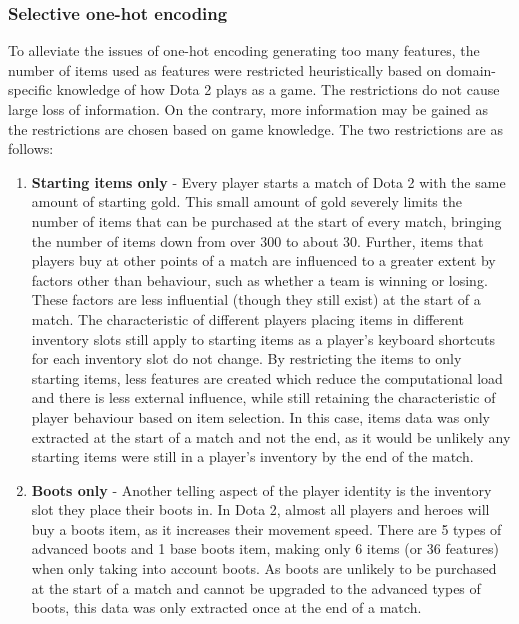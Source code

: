 \documentclass[Report.tex]{subfiles}
\begin{document}
\subsubsection{Selective one-hot encoding}
To alleviate the issues of one-hot encoding generating too many features, the number of items used as features were restricted heuristically based on domain-specific knowledge of how Dota 2 plays as a game. The restrictions do not cause large loss of information. On the contrary, more information may be gained as the restrictions are chosen based on game knowledge. The two restrictions are as follows:
\begin{enumerate}
\item \textbf{Starting items only} - Every player starts a match of Dota 2 with the same amount of starting gold. This small amount of gold severely limits the number of items that can be purchased at the start of every match, bringing the number of items down from over 300 to about 30. Further, items that players buy at other points of a match are influenced to a greater extent by factors other than behaviour, such as whether a team is winning or losing. These factors are less influential (though they still exist) at the start of a match. The characteristic of different players placing items in different inventory slots still apply to starting items as a player's keyboard shortcuts for each inventory slot do not change. By restricting the items to only starting items, less features are created which reduce the computational load and there is less external influence, while still retaining the characteristic of player behaviour based on item selection. In this case, items data was only extracted at the start of a match and not the end, as it would be unlikely any starting items were still in a player's inventory by the end of the match. 

\item \textbf{Boots only} - Another telling aspect of the player identity is the inventory slot they place their boots in. In Dota 2, almost all players and heroes will buy a boots item, as it increases their movement speed. There are 5 types of advanced boots and 1 base boots item, making only 6 items (or 36 features) when only taking into account boots. As boots are unlikely to be purchased at the start of a match and cannot be upgraded to the advanced types of boots, this data was only extracted once at the end of a match. 
\end{enumerate}

\end{document}
